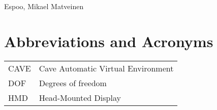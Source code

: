 \documentclass[12pt,a4paper,oneside,pdftex]{report}
\newcommand{\DATE}{}
\newcommand{\AUTHOR}{Mikael Matveinen}
\begin{document}
\vskip 10mm

\noindent Espoo, \DATE
\vskip 5mm
\noindent\AUTHOR

\cleardoublepage
% 

\chapter*{Abbreviations and Acronyms}


\noindent
\begin{longtable}{@{}p{}p{}@{}}
CAVE & Cave Automatic Virtual Environment \\
DOF & Degrees of freedom \\
HMD & Head-Mounted Display
\end{longtable}


\cleardoublepage
\tableofcontents



\label{pages-prelude}
\cleardoublepage

\startfirstchapter
\end{document}
